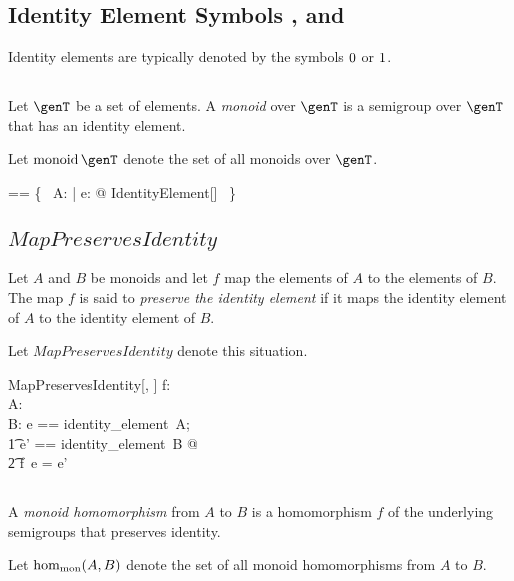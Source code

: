 \documentclass{amsart}
\begin{document}
\subsection{Identity Element Symbols , and }

Identity elements are typically denoted by the symbols  $0$ or $1$.

\subsection{}

Let $\genT$ be a set of elements.
A {\em monoid} over $\genT$ is a semigroup over $\genT$ that has an identity element.

Let $\monoid \genT$ denote the set of all monoids over $\genT$.

\begin{zed}
\monoid \genT == \{~ A: \semigroup \genT | \exists e: \genT @ IdentityElement[\genT] ~\}
\end{zed}


\subsection{$MapPreservesIdentity$}

Let $A$ and $B$ be monoids and let $f$ map the elements of $A$ to the elements of $B$.
The map $f$ is said to {\em preserve the identity element} if it maps the identity element of $A$
to the identity element of $B$.

Let $MapPreservesIdentity$ denote this situation.

\begin{schema}{MapPreservesIdentity}[\genT, \genU]
f: \genT \fun \genU \\
A: \monoid \genT \\
B: \monoid \genU
\where
\LET e == identity\_element~A; \\
\t1	e' == identity\_element~B @ \\
\t2		f~e = e'
\end{schema}

\subsection{}

A {\em monoid homomorphism} from $A$ to $B$ is a homomorphism $f$ of the underlying semigroups
that preserves identity.

Let $\operatorname{hom_{mon}}(A, B)$ denote the set of all monoid homomorphisms from $A$ to $B$.
\end{document}
